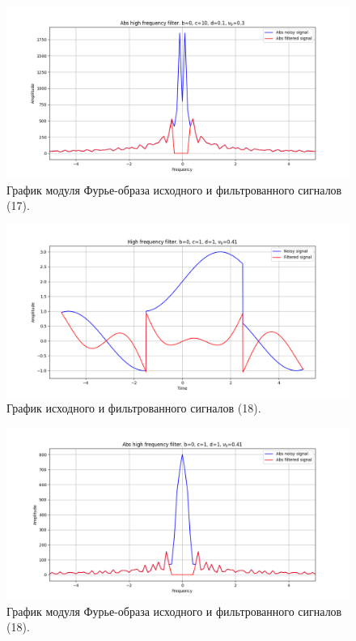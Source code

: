 \documentclass[a4paper, 12pt]{article}
\begin{document}
    \begin{figure}[!htb]
        \centering
        \includegraphics[scale=0.48]{17_abs_u_U_nolow.png}
        \captionsetup{skip=0pt}
        \caption{График модуля Фурье-образа исходного и фильтрованного сигналов (17).}
        \label{fig:fig60}
    \end{figure}
    \begin{figure}[!htb]
        \centering
        \includegraphics[scale=0.48]{18_u_flt_u_nolow.png}
        \captionsetup{skip=0pt}
        \caption{График исходного и фильтрованного сигналов (18).}
        \label{fig:fig61}
    \end{figure}
    \newpage
    \begin{figure}[!htb]
        \centering
        \includegraphics[scale=0.48]{18_abs_u_U_nolow.png}
        \captionsetup{skip=0pt}
        \caption{График модуля Фурье-образа исходного и фильтрованного сигналов (18).}
        \label{fig:fig62}
    \end{figure}
\end{document}

